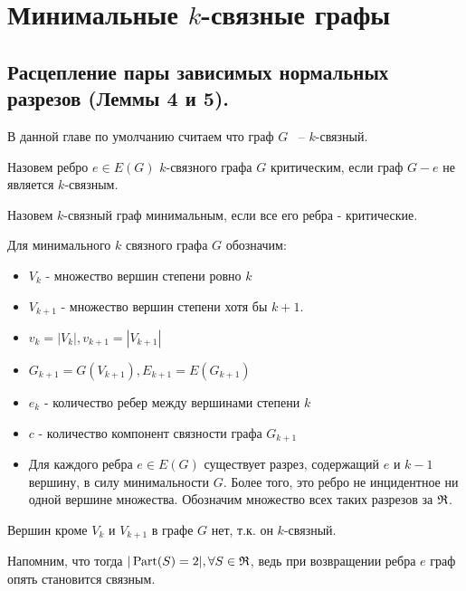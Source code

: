 
\section{Минимальные $k$-связные графы}

\subsection{Расцепление пары зависимых нормальных разрезов (Леммы 4 и 5).}

В данной главе по умолчанию считаем что граф $G$ ~--  $k$-связный. 

\begin{df*}
	Назовем ребро $e \in E(G)$ $k$-связного графа  $G$ критическим, если граф  $G - e$ не является  $k$-связным.
\end{df*}

\begin{df*}
	Назовем $k$-связный граф минимальным, если все его ребра - критические.
\end{df*}

\begin{prop} \label{prop:for_minimum_k_connected_graph}
	Для минимального $k$ связного графа  $G$ обозначим:
	 \begin{itemize}
		 \item $V_k$ - множество вершин степени ровно  $k$
		 \item  $V_{k +1}$ - множество вершин степени хотя бы  $k + 1$. 
		 \item $v_k = |V_k|, v_{k + 1} = |V_{k + 1}|$
		 \item  $G_{k+1} = G(V_{k + 1}), E_{k + 1} = E(G_{k + 1})$
		\item  $e_k$ - количество ребер между вершинами степени  $k$
		\item $c$ - количество компонент связности графа  $G_{k + 1}$
		\item Для каждого ребра  $e \in E(G)$ существует разрез, содержащий  $e$ и  $k - 1$ вершину, в силу минимальности $G$. Более того, это ребро не инцидентное ни одной вершине множества.
			Обозначим множество всех таких разрезов за  $\mathfrak{R}$.
	\end{itemize}

	Вершин кроме $V_k$ и  $V_{k+1}$ в графе  $G$ нет, т.к. он  $k$-связный.
\end{prop}

Напомним, что тогда $|\operatorname{Part}(S) = 2|, \forall S \in \mathfrak{R}$, ведь при возвращении ребра  $e$ граф опять становится связным.

